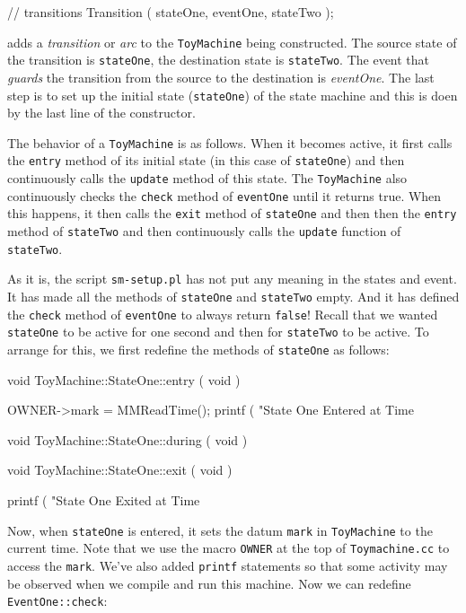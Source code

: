\begin{codesegment}
  // transitions
  Transition ( stateOne, eventOne, stateTwo );
\end{codesegment}

\noindent adds a {\em transition} or {\em arc} to the {\tt ToyMachine} being
constructed. The source state of the transition is {\tt stateOne}, the
destination state is {\tt stateTwo}. The event that {\em guards} the
transition from the source to the destination is {\em eventOne}. The last
step is to set up the initial state ({\tt stateOne}) of the state machine
and this is doen by the last line of the constructor.

The behavior of a {\tt ToyMachine} is as follows. When it becomes active, it
first calls the {\tt entry} method of its initial state (in this case of
{\tt stateOne}) and then continuously calls the {\tt update} method of this
state. The {\tt ToyMachine} also continuously checks the {\tt check} method
of {\tt eventOne} until it returns true. When this happens, it then calls the
{\tt exit} method of {\tt stateOne} and then then the {\tt entry} method of
{\tt stateTwo} and then continuously calls the {\tt update} function of {\tt
stateTwo}.

As it is, the script {\tt sm-setup.pl} has not put any meaning in the states
and event. It has made all the methods of {\tt stateOne} and {\tt stateTwo}
empty. And it has defined the {\tt check} method of {\tt eventOne} to always
return {\tt false}! Recall that we wanted {\tt stateOne} to be active for
one second and then for {\tt stateTwo} to be active. To arrange for this, we
first redefine the methods of {\tt stateOne} as follows:

\begin{codesegment}
  void ToyMachine::StateOne::entry ( void ) {

    OWNER->mark = MMReadTime();
    printf ( "State One Entered at Time %

  }

  void ToyMachine::StateOne::during ( void ) {}

  void ToyMachine::StateOne::exit ( void ) {
 
    printf ( "State One Exited at Time %

  }
\end{codesegment}

\noindent Now, when {\tt stateOne} is entered, it sets the datum {\tt mark}
in {\tt ToyMachine} to the current time. Note that we use the macro {\tt OWNER}
at the top of {\tt Toymachine.cc} to access the {\tt mark}. We've also added
{\tt printf} statements so that some activity may be observed when we compile
and run this machine. Now we can redefine {\tt EventOne::check}:

